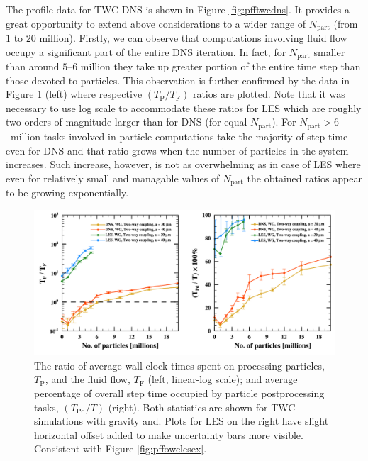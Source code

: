 \documentclass{pracamgren}
\begin{document}
The profile data for TWC DNS is shown in Figure \ref{fig:pfftwcdns}.
It provides a great opportunity to extend above considerations to a wider range of $N_{\text{part}}$ (from $1$ to $20$ million).
Firstly, we can observe that computations involving fluid flow occupy a significant part of the entire DNS iteration.
In fact, for $N_{\text{part}}$ smaller than around $5$--$6$ million they take up greater portion of the entire time step than those devoted to particles.
This observation is further confirmed by the data in Figure \ref{fig:pfftwcex} (left) where respective $(T_{\text{P}} / T_{\text{F}})$ ratios are plotted.
Note that it was necessary to use log scale to accommodate these ratios for LES which are roughly two orders of magnitude larger than for DNS (for equal $N_{\text{part}}$).
For ${N_{\text{part}} > 6}$~million tasks involved in particle computations take the majority of step time even for DNS and that ratio grows when the number of particles in the system increases.
Such increase, however, is not as overwhelming as in case of LES where even for relatively small and managable values of $N_{\text{part}}$ the obtained ratios appear to be growing exponentially.

\begin{figure}[ht]
\centering
\includegraphics[width=13.5cm]{figures/3-10_pfftwcex.pdf}
\caption{
The ratio of average wall-clock times spent on processing particles, $T_{\text{P}}$, and the fluid flow, $T_{\text{F}}$ (left, linear-log scale); and average percentage of overall step time occupied by particle postprocessing tasks, $(T_{\text{Pd}} / T)$ (right).
Both statistics are shown for TWC simulations with gravity and.
Plots for LES on the right have slight horizontal offset added to make uncertainty bars more visible.
Consistent with Figure \ref{fig:pffowclesex}.
}
\label{fig:pfftwcex}
\end{figure}
\end{document}
